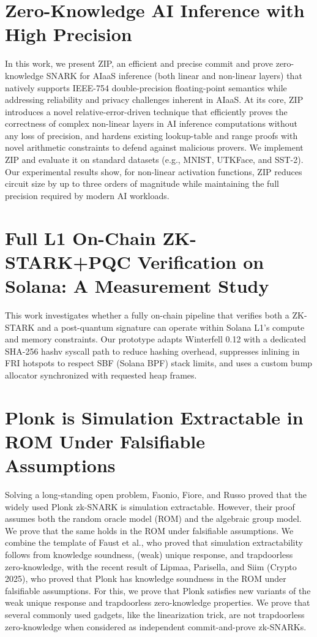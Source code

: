 \documentclass[11pt,oneside]{book}
\theoremstyle{definition}
\theoremstyle{remark}
\theoremstyle{plain}
\begin{document}
\section{\cite{cryptoeprint:2025/1732} Zero-Knowledge AI Inference with High Precision}
In this work, we present ZIP, an efficient and precise commit and prove zero-knowledge SNARK for AIaaS inference (both linear and non-linear layers) that natively supports IEEE-754 double-precision floating-point semantics while addressing reliability and privacy challenges inherent in AIaaS. At its core, ZIP introduces a novel relative-error-driven technique that efficiently proves the correctness of complex non-linear layers in AI inference computations without any loss of precision, and hardens existing lookup-table and range proofs with novel arithmetic constraints to defend against malicious provers. We implement ZIP and evaluate it on standard datasets (e.g., MNIST, UTKFace, and SST-2). Our experimental results show, for non-linear activation functions, ZIP reduces circuit size by up to three orders of magnitude while maintaining the full precision required by modern AI workloads.

\section{\cite{cryptoeprint:2025/1741} Full L1 On-Chain ZK-STARK+PQC Verification on Solana: A Measurement Study}
This work investigates whether a fully on-chain pipeline that verifies both a ZK-STARK and a post-quantum signature can operate within Solana L1's compute and memory constraints. Our prototype adapts Winterfell 0.12 with a dedicated SHA-256 hashv syscall path to reduce hashing overhead, suppresses inlining in FRI hotspots to respect SBF (Solana BPF) stack limits, and uses a custom bump allocator synchronized with requested heap frames. 

\section{\cite{cryptoeprint:2025/1759} Plonk is Simulation Extractable in ROM Under Falsifiable Assumptions}
Solving a long-standing open problem, Faonio, Fiore, and Russo proved that the widely used Plonk zk-SNARK is simulation extractable. However, their proof assumes both the random oracle model (ROM) and the algebraic group model. We prove that the same holds in the ROM under falsifiable assumptions. We combine the template of Faust et al., who proved that simulation extractability follows from knowledge soundness, (weak) unique response, and trapdoorless zero-knowledge, with the recent result of Lipmaa, Parisella, and Siim (Crypto 2025), who proved that Plonk has knowledge soundness in the ROM under falsifiable assumptions. For this, we prove that Plonk satisfies new variants of the weak unique response and trapdoorless zero-knowledge properties. We prove that several commonly used gadgets, like the linearization trick, are not trapdoorless zero-knowledge when considered as independent commit-and-prove zk-SNARKs.


%
%
\printbibliography
\end{document}
